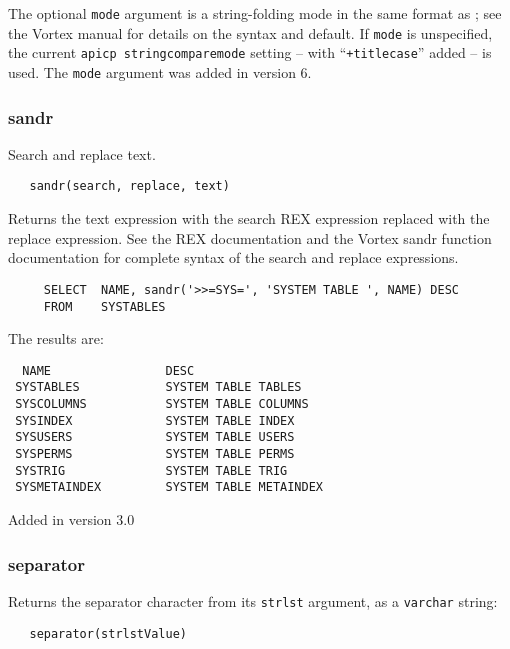   The optional \verb`mode` argument is a string-folding mode in the
same format as {\tt <apicp stringcomparemode>}; see the Vortex manual
for details on the syntax and default.  If \verb`mode` is unspecified,
the current {\tt apicp stringcomparemode} setting -- with ``{\tt +titlecase}''
added -- is used.  The \verb`mode` argument was added in version 6.

\subsubsection{sandr}

Search and replace text.
\begin{verbatim}
   sandr(search, replace, text)
\end{verbatim}

Returns the text expression with the search REX expression replaced
with the replace expression.  See the REX documentation and the
Vortex sandr function documentation for complete syntax of the search
and replace expressions.

\begin{verbatim}
     SELECT  NAME, sandr('>>=SYS=', 'SYSTEM TABLE ', NAME) DESC
     FROM    SYSTABLES
\end{verbatim}

The results are:

\begin{screen}
\begin{verbatim}
  NAME                DESC
 SYSTABLES            SYSTEM TABLE TABLES
 SYSCOLUMNS           SYSTEM TABLE COLUMNS
 SYSINDEX             SYSTEM TABLE INDEX
 SYSUSERS             SYSTEM TABLE USERS
 SYSPERMS             SYSTEM TABLE PERMS
 SYSTRIG              SYSTEM TABLE TRIG
 SYSMETAINDEX         SYSTEM TABLE METAINDEX
\end{verbatim}
\end{screen}

Added in version 3.0

\subsubsection{separator}

Returns the separator character from its \verb`strlst` argument,
as a \verb`varchar` string:

\begin{verbatim}
   separator(strlstValue)
\end{verbatim}

